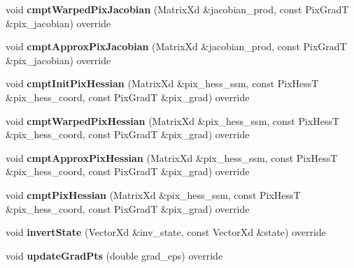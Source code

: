 \begin{DoxyCompactItemize}
\item 
\hypertarget{classSpline_a6e1aa7d521d50aded3296212c623edb9}{void {\bfseries cmpt\-Warped\-Pix\-Jacobian} (Matrix\-Xd \&jacobian\-\_\-prod, const Pix\-Grad\-T \&pix\-\_\-jacobian) override}\label{classSpline_a6e1aa7d521d50aded3296212c623edb9}

\item 
\hypertarget{classSpline_a8d18b79333b0983ea62916c9e0e3413e}{void {\bfseries cmpt\-Approx\-Pix\-Jacobian} (Matrix\-Xd \&jacobian\-\_\-prod, const Pix\-Grad\-T \&pix\-\_\-jacobian) override}\label{classSpline_a8d18b79333b0983ea62916c9e0e3413e}

\item 
\hypertarget{classSpline_a35126e66513be9c5b004ace98810fe72}{void {\bfseries cmpt\-Init\-Pix\-Hessian} (Matrix\-Xd \&pix\-\_\-hess\-\_\-ssm, const Pix\-Hess\-T \&pix\-\_\-hess\-\_\-coord, const Pix\-Grad\-T \&pix\-\_\-grad) override}\label{classSpline_a35126e66513be9c5b004ace98810fe72}

\item 
\hypertarget{classSpline_a25f475f2f207a984396f038985de78e8}{void {\bfseries cmpt\-Warped\-Pix\-Hessian} (Matrix\-Xd \&pix\-\_\-hess\-\_\-ssm, const Pix\-Hess\-T \&pix\-\_\-hess\-\_\-coord, const Pix\-Grad\-T \&pix\-\_\-grad) override}\label{classSpline_a25f475f2f207a984396f038985de78e8}

\item 
\hypertarget{classSpline_a6678af81a141bcf0855125fecb44fe9d}{void {\bfseries cmpt\-Approx\-Pix\-Hessian} (Matrix\-Xd \&pix\-\_\-hess\-\_\-ssm, const Pix\-Hess\-T \&pix\-\_\-hess\-\_\-coord, const Pix\-Grad\-T \&pix\-\_\-grad) override}\label{classSpline_a6678af81a141bcf0855125fecb44fe9d}

\item 
\hypertarget{classSpline_a974cff65edb60cd6a4df1849f5947aae}{void {\bfseries cmpt\-Pix\-Hessian} (Matrix\-Xd \&pix\-\_\-hess\-\_\-ssm, const Pix\-Hess\-T \&pix\-\_\-hess\-\_\-coord, const Pix\-Grad\-T \&pix\-\_\-grad) override}\label{classSpline_a974cff65edb60cd6a4df1849f5947aae}

\item 
\hypertarget{classSpline_a2039441e006d64eeb615b4e68d2388bd}{void {\bfseries invert\-State} (Vector\-Xd \&inv\-\_\-state, const Vector\-Xd \&state) override}\label{classSpline_a2039441e006d64eeb615b4e68d2388bd}

\item 
\hypertarget{classSpline_a1117278ad082ef0e781f099d9613efbe}{void {\bfseries update\-Grad\-Pts} (double grad\-\_\-eps) override}\label{classSpline_a1117278ad082ef0e781f099d9613efbe}


\end{DoxyCompactItemize}
